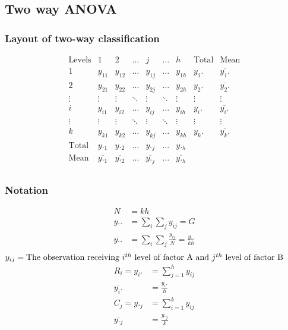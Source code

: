 \documentclass[oneside,11pt,pdftex]{book}%
\numberwithin{equation}{section}
\numberwithin{section}{chapter}
\numberwithin{equation}{chapter}
\begin{document}
\subsection{Two way ANOVA}
\subsubsection{Layout of two-way classification}
\[ \begin{matrix}
	\text{Levels} & 1 & 2 & \dots & j & \dots & h & \text{Total} & \text{Mean}\\
	1 & y_{11} & y_{12} & \dots & y_{1j} & \dots & y_{1h} & y_1. & \overline{y_1.}\\
	2 & y_{21} & y_{22} & \dots & y_{2j} & \dots & y_{2h} & y_2. & \overline{y_2.}\\
	\vdots & \vdots & \vdots & \ddots & \vdots & \ddots & \vdots & \vdots & \vdots\\
	i & y_{i1} & y_{i2} & \dots & y_{ij} & \dots & y_{ih} & y_i. & \overline{y_i.}\\
	\vdots & \vdots & \vdots & \ddots & \vdots & \ddots & \vdots & \vdots & \vdots\\
	k & y_{k1} & y_{k2} & \dots & y_{kj} & \dots & y_{kh} & y_k. & \overline{y_k.}\\
	\text{Total} & y._1 & y._2 & \dots & y._j & \dots & y._h &  & \\
	\text{Mean} & \overline{y._1} & \overline{y._2} & \dots & \overline{y._j} & \dots & \overline{y._h} &  & \\
\end{matrix} \]

\subsubsection{Notation}
\begin{align*}
	N&=kh\\
	y..&=\sum_i \sum_j y_{ij}=G\\
	\overline{y..}&=\sum_i \sum_j \frac{y_{ij}}{N}=\frac{y..}{kh}\\
\end{align*}
$y_{ij}=\text{The observation receiving $ i^{th} $ level of factor A and $ j^{th} $ level of factor B}$
\begin{align*}
	R_i=y_i.&=\sum_{j=1}^{h}y_{ij}\\
	\overline{y_i.}&=\frac{y_i.}{h}\\
	C_j=y._j&=\sum_{i=1}^k y_{ij}\\
	\overline{y._j}&=\frac{y._j}{k}
\end{align*}
\end{document}

